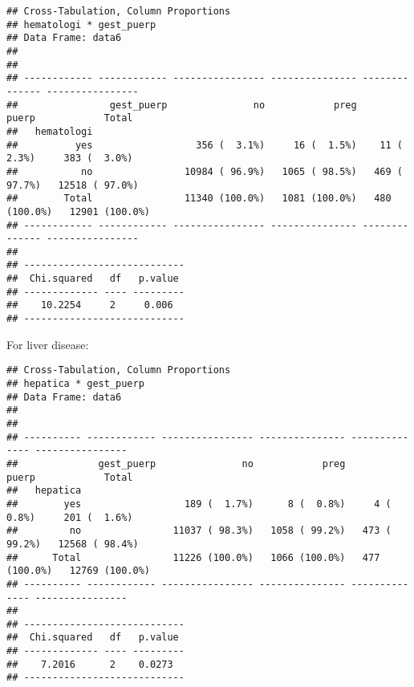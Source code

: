 \documentclass[
]{article}
\newenvironment{Shaded}{\begin{snugshade}}{\end{snugshade}}
\newcommand{\DataTypeTok}[1]{\textcolor[rgb]{0.13,0.29,0.53}{#1}}
\newcommand{\KeywordTok}[1]{\textcolor[rgb]{0.13,0.29,0.53}{\textbf{#1}}}
\newcommand{\NormalTok}[1]{#1}
\newcommand{\OperatorTok}[1]{\textcolor[rgb]{0.81,0.36,0.00}{\textbf{#1}}}
\newcommand{\OtherTok}[1]{\textcolor[rgb]{0.56,0.35,0.01}{#1}}
\newcommand{\StringTok}[1]{\textcolor[rgb]{0.31,0.60,0.02}{#1}}
\begin{document}
\begin{verbatim}
## Cross-Tabulation, Column Proportions  
## hematologi * gest_puerp  
## Data Frame: data6  
## 
## 
## ------------ ------------ ---------------- --------------- -------------- ----------------
##                gest_puerp               no            preg          puerp            Total
##   hematologi                                                                              
##          yes                  356 (  3.1%)     16 (  1.5%)    11 (  2.3%)     383 (  3.0%)
##           no                10984 ( 96.9%)   1065 ( 98.5%)   469 ( 97.7%)   12518 ( 97.0%)
##        Total                11340 (100.0%)   1081 (100.0%)   480 (100.0%)   12901 (100.0%)
## ------------ ------------ ---------------- --------------- -------------- ----------------
## 
## ----------------------------
##  Chi.squared   df   p.value 
## ------------- ---- ---------
##    10.2254     2     0.006  
## ----------------------------
\end{verbatim}

For liver disease:

\begin{Shaded}
\end{Shaded}

\begin{verbatim}
## Cross-Tabulation, Column Proportions  
## hepatica * gest_puerp  
## Data Frame: data6  
## 
## 
## ---------- ------------ ---------------- --------------- -------------- ----------------
##              gest_puerp               no            preg          puerp            Total
##   hepatica                                                                              
##        yes                  189 (  1.7%)      8 (  0.8%)     4 (  0.8%)     201 (  1.6%)
##         no                11037 ( 98.3%)   1058 ( 99.2%)   473 ( 99.2%)   12568 ( 98.4%)
##      Total                11226 (100.0%)   1066 (100.0%)   477 (100.0%)   12769 (100.0%)
## ---------- ------------ ---------------- --------------- -------------- ----------------
## 
## ----------------------------
##  Chi.squared   df   p.value 
## ------------- ---- ---------
##    7.2016      2    0.0273  
## ----------------------------
\end{verbatim}
\end{document}
